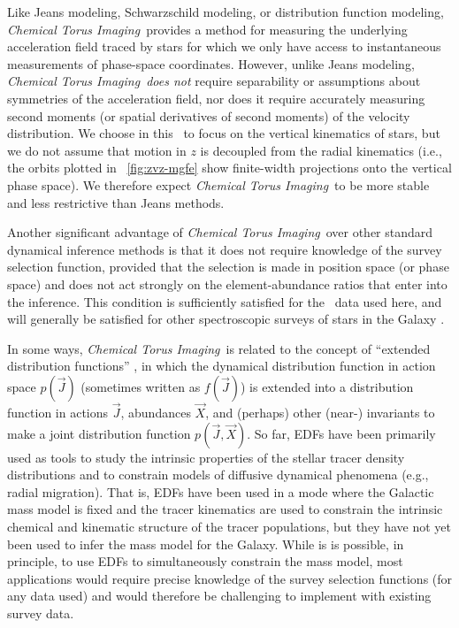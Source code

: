 \documentclass[modern]{aastex63}
\newcommand{\methodname}{\textsl{Chemical Torus Imaging}}
\newcommand{\apogee}{\acronym{APOGEE}}
\begin{document}
Like Jeans modeling, Schwarzschild modeling, or distribution function modeling,
\methodname\ provides a method for measuring the underlying acceleration field
traced by stars for which we only have access to instantaneous measurements of
phase-space coordinates.
However, unlike Jeans modeling, \methodname\ \emph{does not} require
separability or assumptions about symmetries of the acceleration field, nor does
it require accurately measuring second moments (or spatial derivatives of second
moments) of the velocity distribution.
We choose in this \documentname\ to focus on the vertical kinematics of stars,
but we do not assume that motion in $z$ is decoupled from the radial kinematics
(i.e., the orbits plotted in \figurename~\ref{fig:zvz-mgfe} show finite-width
projections onto the vertical phase space).
We therefore expect \methodname\ to be more stable and less restrictive than
Jeans methods.

Another significant advantage of \methodname\ over other standard dynamical
inference methods is that it does not require knowledge of the survey selection
function, provided that the selection is made in position space (or phase space)
and does not act strongly on the element-abundance ratios that enter into the
inference.
This condition is sufficiently satisfied for the \apogee\ data used here, and
will generally be satisfied for other spectroscopic surveys of stars in the
Galaxy \citep[e.g., ;][]{Martell:2017, Buder:2018}.

In some ways, \methodname\ is related to the concept of ``extended distribution
functions'' \citep[EDFs; e.g.,][]{Sanders:2015,Das:2016}, in which the dynamical
distribution function in action space $p(\vec{J})$ (sometimes written as
$f(\vec{J})$) is extended into a distribution function in actions $\vec{J}$,
abundances $\vec{X}$, and (perhaps) other (near-) invariants to make a joint
distribution function $p(\vec{J},\vec{X})$.
So far, EDFs have been primarily used as tools to study the intrinsic properties
of the stellar tracer density distributions and to constrain models of diffusive
dynamical phenomena (e.g., radial migration).
That is, EDFs have been used in a mode where the Galactic mass model is fixed
and the tracer kinematics are used to constrain the intrinsic chemical and
kinematic structure of the tracer populations, but they have not yet been used
to infer the mass model for the Galaxy.
While is is possible, in principle, to use EDFs to simultaneously constrain the
mass model, most applications would require precise knowledge of the survey
selection functions (for any data used) and would therefore be challenging to
implement with existing survey data.
\end{document}
